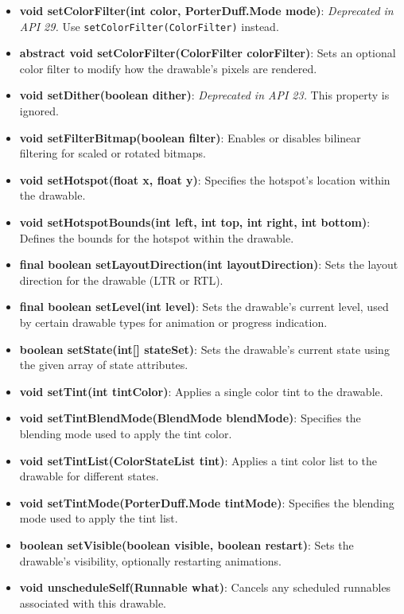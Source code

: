 \documentclass{report}
\begin{document}
\begin{itemize}
\begin{itemize}
                \item \textbf{void setColorFilter(int color, PorterDuff.Mode mode)}: \textit{Deprecated in API 29.} Use \texttt{setColorFilter(ColorFilter)} instead.
                \item \textbf{abstract void setColorFilter(ColorFilter colorFilter)}: Sets an optional color filter to modify how the drawable’s pixels are rendered.
                \item \textbf{void setDither(boolean dither)}: \textit{Deprecated in API 23.} This property is ignored.
                \item \textbf{void setFilterBitmap(boolean filter)}: Enables or disables bilinear filtering for scaled or rotated bitmaps.
                \item \textbf{void setHotspot(float x, float y)}: Specifies the hotspot’s location within the drawable.
                \item \textbf{void setHotspotBounds(int left, int top, int right, int bottom)}: Defines the bounds for the hotspot within the drawable.
                \item \textbf{final boolean setLayoutDirection(int layoutDirection)}: Sets the layout direction for the drawable (LTR or RTL).
                \item \textbf{final boolean setLevel(int level)}: Sets the drawable’s current level, used by certain drawable types for animation or progress indication.
                \item \textbf{boolean setState(int[] stateSet)}: Sets the drawable’s current state using the given array of state attributes.
                \item \textbf{void setTint(int tintColor)}: Applies a single color tint to the drawable.
                \item \textbf{void setTintBlendMode(BlendMode blendMode)}: Specifies the blending mode used to apply the tint color.
                \item \textbf{void setTintList(ColorStateList tint)}: Applies a tint color list to the drawable for different states.
                \item \textbf{void setTintMode(PorterDuff.Mode tintMode)}: Specifies the blending mode used to apply the tint list.
                \item \textbf{boolean setVisible(boolean visible, boolean restart)}: Sets the drawable’s visibility, optionally restarting animations.
                \item \textbf{void unscheduleSelf(Runnable what)}: Cancels any scheduled runnables associated with this drawable.
            \end{itemize}


\end{itemize}
\end{document}
